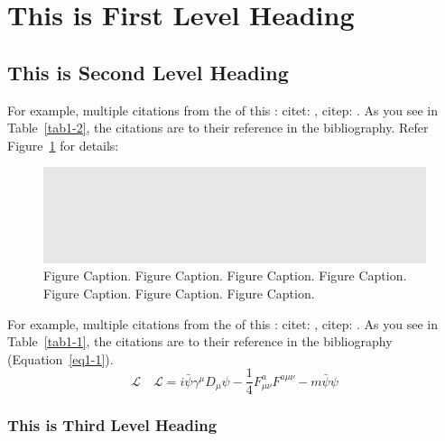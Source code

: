 \section{This is First Level Heading}

\lipsum[1-2]

\subsection{This is Second Level Heading}

\lipsum[3]

For example, multiple citations from the  of this :
citet: \citet{CR7,CR8}, citep: \citep{CR9,CR6}.
As you see in Table~\ref{tab1-2}, the citations are  to their
reference in the bibliography. Refer Figure~\ref{fig1-1} for details:

\begin{figure}
     \includegraphics{./assets/img/01.eps}
     \caption{Figure Caption. Figure Caption.
          Figure Caption. Figure Caption. Figure Caption. 
          Figure Caption. Figure Caption.
          \label{fig1-1}}
\end{figure}

For example, multiple citations from the  of this :
citet: \citet{CR9,CR6}, citep: \citep{CR9,CR6}.
As you see in Table~\ref{tab1-1}, the citations are  to their
reference in the bibliography (Equation~\ref{eq1-1}).
\begin{equation}
     \mathcal{L}\quad \mathbf{\mathcal{L}} = i \bar{\psi} \gamma^\mu D_\mu \psi - 
     \frac{1}{4} F_{\mu\nu}^a F^{a\mu\nu} - m \bar{\psi} \psi\label{eq1-1}
\end{equation}

\subsubsection{This is Third Level Heading}

